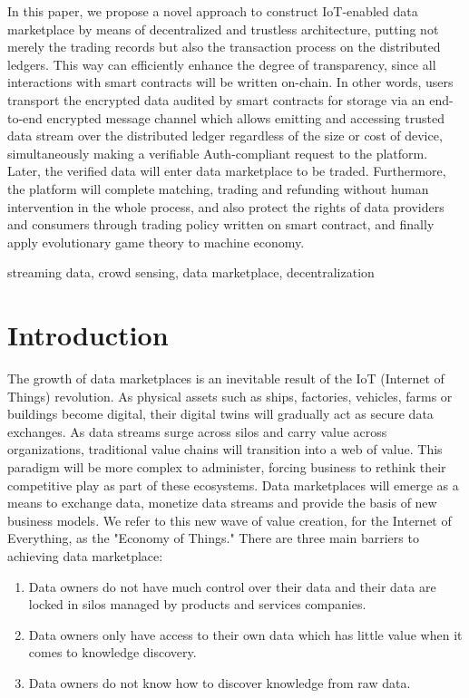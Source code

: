 \documentclass[journal,10pt,a4paper]{IEEEtran}
\begin{document}
In this paper, we propose a novel approach to construct IoT-enabled data marketplace by means of decentralized and trustless architecture, putting not merely the trading records but also the transaction process on the distributed ledgers. This way can efficiently enhance the degree of transparency, since all interactions with smart contracts will be written on-chain. In other words, users transport the encrypted data audited by smart contracts for storage via an end-to-end encrypted message channel which allows emitting and accessing trusted data stream over the distributed ledger regardless of the size or cost of device, simultaneously making a verifiable Auth-compliant request to the platform. Later, the verified data will enter data marketplace to be traded. Furthermore, the platform will complete matching, trading and refunding without human intervention in the whole process, and also protect the rights of data providers and consumers through trading policy written on smart contract, and finally apply evolutionary game theory to machine economy.

\begin{IEEEkeywords}
    streaming data, crowd sensing, data marketplace, decentralization
\end{IEEEkeywords}

\section{\normalsize\textbf{Introduction}}
The growth of data marketplaces is an inevitable result of the IoT (Internet of Things) revolution. As physical assets such as ships, factories, vehicles, farms or buildings become digital, their digital twins will gradually act as secure data exchanges.\cite{digitaltwin}\cite{AutonomousDriving} As data streams surge across silos and carry value across organizations, traditional value chains will transition into a web of value. This paradigm will be more complex to administer, forcing business to rethink their competitive play as part of these ecosystems. Data marketplaces will emerge as a means to exchange data, monetize data streams and provide the basis of new business models. We refer to this new wave of value creation, for the Internet of Everything, as the "Economy of Things." There are three main barriers to achieving data marketplace:
\begin{enumerate}
    \item Data owners do not have much control over their data and their data are locked in silos managed by products and services companies.
    \item Data owners only have access to their own data which has little value when it comes to knowledge discovery.
    \item Data owners do not know how to discover knowledge from raw data.
\end{enumerate}
\end{document}
